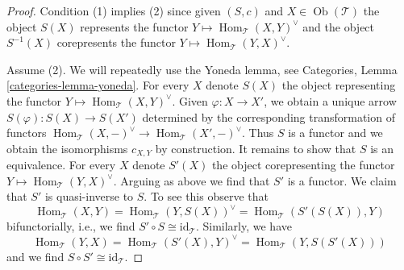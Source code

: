 \documentclass{stacks-project}
\theoremstyle{plain}
\theoremstyle{definition}
\theoremstyle{remark}
\numberwithin{equation}{subsection}
\def\Hom{\mathop{\mathrm{Hom}}\nolimits}
\def\Ob{\mathop{\mathrm{Ob}}\nolimits}
\begin{document}
\begin{proof}
Condition (1) implies (2) since given $(S, c)$ and $X \in \Ob(\mathcal{T})$
the object $S(X)$ represents the functor
$Y \mapsto \Hom_\mathcal{T}(X, Y)^\vee$ and the object $S^{-1}(X)$ corepresents
the functor $Y \mapsto \Hom_\mathcal{T}(Y, X)^\vee$.

\medskip\noindent
Assume (2). We will repeatedly use the Yoneda lemma, see
Categories, Lemma \ref{categories-lemma-yoneda}.
For every $X$ denote $S(X)$ the object representing the
functor $Y \mapsto \Hom_\mathcal{T}(X, Y)^\vee$. Given
$\varphi : X \to X'$, we obtain a unique arrow $S(\varphi) : S(X) \to S(X')$
determined by the corresponding transformation of functors
$\Hom_\mathcal{T}(X, -)^\vee \to \Hom_\mathcal{T}(X', -)^\vee$.
Thus $S$ is a functor and we obtain the isomorphisms $c_{X, Y}$
by construction. It remains to show that $S$ is an equivalence.
For every $X$ denote $S'(X)$ the object corepresenting the
functor $Y \mapsto \Hom_\mathcal{T}(Y, X)^\vee$. Arguing as
above we find that $S'$ is a functor. We claim that $S'$
is quasi-inverse to $S$. To see this observe that
$$
\Hom_\mathcal{T}(X, Y) = \Hom_\mathcal{T}(Y, S(X))^\vee =
\Hom_\mathcal{T}(S'(S(X)), Y)
$$
bifunctorially, i.e., we find $S' \circ S \cong \text{id}_\mathcal{T}$.
Similarly, we have
$$
\Hom_\mathcal{T}(Y, X) = \Hom_\mathcal{T}(S'(X), Y)^\vee =
\Hom_\mathcal{T}(Y, S(S'(X)))
$$
and we find $S \circ S' \cong \text{id}_\mathcal{T}$.
\end{proof}
\end{document}
